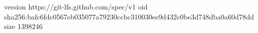 version https://git-lfs.github.com/spec/v1
oid sha256:bafc6fdc0567eb035077a79230ccbc310030ee9d432c0be3d748dba0a60d78dd
size 1398246
